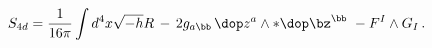 \begin{equation}
 S_{4d}=\frac{1}{16 \pi} \int d^4 x \sqrt{-h} R \,
  - \, 2 g_{a\bb} \, \dop z^a \wedge *\dop \bz^{\bb} \,\,
  - F^I \wedge G_I \, . \label{S4D}
\end{equation}


